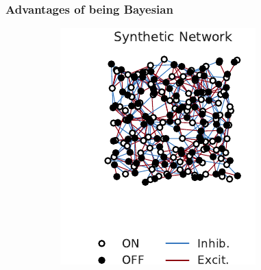 \subsubsection{Advantages of being Bayesian}
\label{sec:advantages}
\begin{figure}[t!]
  \centering
  \vspace{-.2in}
  \begin{subfigure}[b]{1.8in}
    \centering
    \caption{}
    \vspace{-.25in}
    \includegraphics[width=\textwidth]{figures/ch5/synth_rgc_true_network.pdf}
    \label{fig:synth_rgc_true_network}
  \end{subfigure}
  ~
  \begin{subfigure}[b]{1.8in}
    \centering
    \caption{}
    \vspace{-.25in}

\end{subfigure}
\end{figure}
